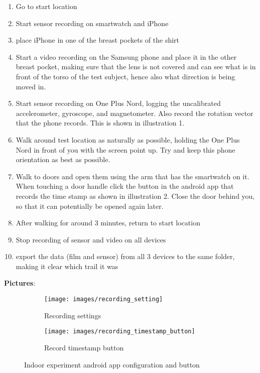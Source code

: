 \begin{enumerate}
	\def\labelenumi{\arabic{enumi}.}
	\tightlist
	\item
	Go to start location
	\item
	Start sensor recording on smartwatch and iPhone
	\item
	place iPhone in one of the breast pockets of the shirt
	\item
	Start a video recording on the Samsung phone and place it in the other
	breast pocket, making sure that the lens is not covered and can see
	what is in front of the torso of the test subject, hence also what
	direction is being moved in.
	\item
	Start sensor recording on One Plus Nord, logging the uncalibrated
	accelerometer, gyroscope, and magnetometer. Also record the rotation
	vector that the phone records. This is shown in illustration 1.
	\item
	Walk around test location as naturally as possible, holding the One
	Plus Nord in front of you with the screen point up. Try and keep this
	phone orientation as best as possible.
	\item
	Walk to doors and open them using the arm that has the smartwatch on
	it. When touching a door handle click the button in the android app
	that records the time stamp as shown in illustration 2. Close the door
	behind you, so that it can potentially be opened again later.
	\item
	After walking for around 3 minutes, return to start location
	\item
	Stop recording of sensor and video on all devices
	\item
	export the data (film and sensor) from all 3 devices to the same
	folder, making it clear which trail it was
\end{enumerate}

\textbf{Pictures}:
\begin{figure}[H]
	\centering
	\begin{subfigure}[t]{.45\textwidth}
		\centering
		\texttt{[image: images/recording\_setting]}
		\caption{Recording settings}
		\label{fig:recording_setting}
	\end{subfigure}
	\begin{subfigure}[t]{.45\textwidth}
		\centering
		\texttt{[image: images/recording\_timestamp\_button]}
		\caption{Record timestamp button}
		\label{fig:recording_timestamp_button}
	\end{subfigure}
\caption{Indoor experiment android app configuration and button}
\end{figure}



